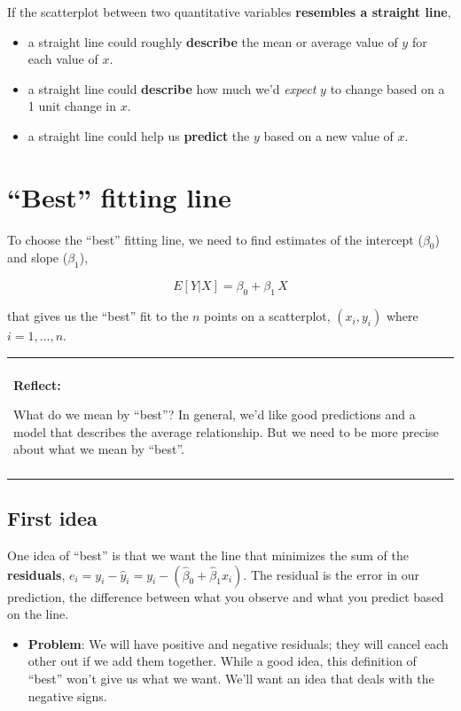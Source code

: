 \documentclass[
]{book}
\providecommand{\tightlist}{%
  \setlength{\itemsep}{0pt}\setlength{\parskip}{0pt}}
\newenvironment{reflect}
{
    \begin{center}
    
    \begin{tabular}{|p{0.8\textwidth}|}
    \rowcolor{LightBlue}
    \hline\\
    \rowcolor{LightBlue}
    \textbf{Reflect:}
}
{
    \\\rowcolor{LightBlue}
    \\\hline
    \end{tabular} 
    \end{center}
}
\begin{document}
If the scatterplot between two quantitative variables \textbf{resembles a straight line},

\begin{itemize}
\tightlist
\item
  a straight line could roughly \textbf{describe} the mean or average value of \(y\) for each value of \(x\).
\item
  a straight line could \textbf{describe} how much we'd \emph{expect} \(y\) to change based on a 1 unit change in \(x\).
\item
  a straight line could help us \textbf{predict} the \(y\) based on a new value of \(x\).
\end{itemize}

\hypertarget{best-fitting-line}{%
\section{``Best'' fitting line}\label{best-fitting-line}}

To choose the ``best'' fitting line, we need to find estimates of the intercept (\(\beta_0\)) and slope (\(\beta_1\)),

\[ E[Y | X] =  \beta_0 + \beta_1\,X \]

that gives us the ``best'' fit to the \(n\) points on a scatterplot, \((x_i,y_i)\) where \(i=1,...,n\).

\begin{reflect}
What do we mean by ``best''? In general, we'd like good predictions and
a model that describes the average relationship. But we need to be more
precise about what we mean by ``best''.
\end{reflect}

\hypertarget{first-idea}{%
\subsection{First idea}\label{first-idea}}

One idea of ``best'' is that we want the line that minimizes the sum of the \textbf{residuals}, \(e_i = y_i - \hat{y}_i = y_i - ( \hat{\beta}_0 + \hat{\beta}_1x_i)\). The residual is the error in our prediction, the difference between what you observe and what you predict based on the line.

\begin{itemize}
\tightlist
\item
  \textbf{Problem}: We will have positive and negative residuals; they will cancel each other out if we add them together. While a good idea, this definition of ``best'' won't give us what we want. We'll want an idea that deals with the negative signs.
\end{itemize}
\end{document}
